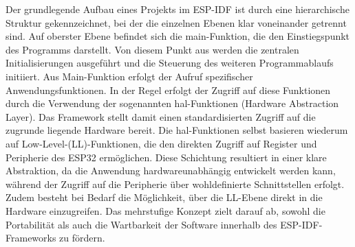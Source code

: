 Der grundlegende Aufbau eines Projekts im ESP-IDF ist durch eine hierarchische Struktur gekennzeichnet, bei der die einzelnen Ebenen klar voneinander getrennt sind.
Auf oberster Ebene befindet sich die main-Funktion, die den Einstiegspunkt des Programms darstellt.
Von diesem Punkt aus werden die zentralen Initialisierungen ausgeführt und die Steuerung des weiteren Programmablaufs initiiert.
Aus Main-Funktion erfolgt der Aufruf spezifischer Anwendungsfunktionen.
In der Regel erfolgt der Zugriff auf diese Funktionen durch die Verwendung der sogenannten \gls{hal}-Funktionen (Hardware Abstraction Layer).
Das Framework stellt damit einen standardisierten Zugriff auf die zugrunde liegende Hardware bereit.
Die \gls{hal}-Funktionen selbst basieren wiederum auf Low-Level-(LL)-Funktionen, die den direkten Zugriff auf Register und Peripherie des ESP32 ermöglichen.
Diese Schichtung resultiert in einer klare Abstraktion, da die Anwendung hardwareunabhängig entwickelt werden kann, während der Zugriff auf die Peripherie über wohldefinierte Schnittstellen erfolgt.
Zudem besteht bei Bedarf die Möglichkeit, über die LL-Ebene direkt in die Hardware einzugreifen.
Das mehrstufige Konzept zielt darauf ab, sowohl die Portabilität als auch die Wartbarkeit der Software innerhalb des ESP-IDF-Frameworks zu fördern.









































